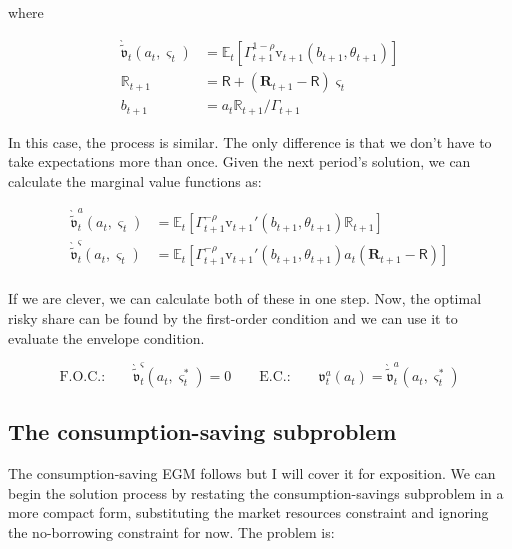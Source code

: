 \documentclass{article}
\newcommand{\tShkEmp}{\theta}
\newcommand{\Ex}{\mathbb{E}}
\newcommand{\CRRA}{\rho}
\newcommand{\bRat}{b}
\newcommand{\vFunc}{\mathrm{v}}
\newcommand{\Rfree}{\mathsf{R}}
\newcommand{\riskyshare}{\varsigma}
\newcommand{\PGro}{\Gamma}
\newcommand{\aRat}{a}
\newcommand{\Rport}{\mathbb{R}}
\newcommand{\Risky}{\mathbf{R}}
\newcommand{\vEnd}{\mathfrak{v}}
\newcommand{\vOptAlt}{\grave{\tilde{\mathfrak{v}}}}
\begin{document}
where

\begin{equation}
\begin{split}
    \vOptAlt_{t}(\aRat_{t}, \riskyshare_{t}) & =  \Ex_{t} \left[ \PGro_{t+1}^{1-\CRRA} \vFunc_{t+1}\left(\bRat_{t+1}, \tShkEmp_{t+1}\right)   \right] \\
    \Rport_{t+1} & = \Rfree + (\Risky_{t+1} - \Rfree) \riskyshare_{t} \\
    \bRat_{t+1} & = \aRat_{t} \Rport_{t+1} / \PGro_{t+1}
  \end{split}
\end{equation}

In this case, the process is similar. The only difference is that we don't have to take expectations more than once. Given the next period's solution, we can calculate the marginal value functions as:

\begin{equation}
\begin{split}
    \vOptAlt_{t}^{\aRat}(\aRat_{t}, \riskyshare_{t}) & =  \Ex_{t} \left[ \PGro_{t+1}^{-\CRRA} \vFunc_{t+1}'\left(\bRat_{t+1}, \tShkEmp_{t+1}\right) \Rport_{t+1}   \right] \\
    \vOptAlt_{t}^{\riskyshare}(\aRat_{t}, \riskyshare_{t}) & =  \Ex_{t} \left[ \PGro_{t+1}^{-\CRRA} \vFunc_{t+1}'\left(\bRat_{t+1}, \tShkEmp_{t+1}\right) \aRat_{t} (\Risky_{t+1} - \Rfree)   \right] \\
  \end{split}
\end{equation}

If we are clever, we can calculate both of these in one step. Now, the optimal risky share can be found by the first-order condition and we can use it to evaluate the envelope condition.

\begin{equation}
\text{F.O.C.:} \qquad \vOptAlt_{t}^{\riskyshare}(\aRat_{t}, \riskyshare_{t}^{*})  = 0 \qquad
  \text{E.C.:} \qquad \vEnd_{t}^{\aRat}(\aRat_{t}) = \vOptAlt_{t}^{\aRat}(\aRat_{t}, \riskyshare_{t}^{*})
\end{equation}

\subsection{The consumption-saving subproblem}\label{The consumption-saving subproblem}

The consumption-saving EGM follows \citet{Carroll2006} but I will cover it for exposition. We can begin the solution process by restating the consumption-savings subproblem in a more compact form, substituting the market resources constraint and ignoring the no-borrowing constraint for now. The problem is:
\end{document}
